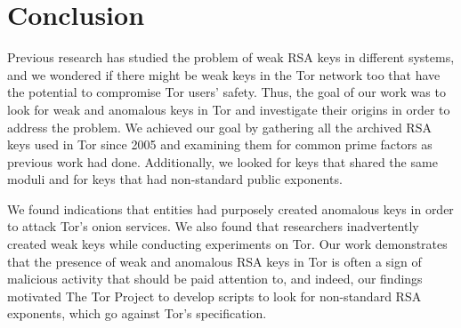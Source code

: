 \section{Conclusion}
\label{sec:conclusion}

Previous research has studied the problem of weak RSA keys in different
systems, and we wondered if there might be weak keys in the Tor
network too that have the potential to compromise Tor users' safety.
Thus, the goal of our work was to look for weak and anomalous keys in Tor
and investigate their origins in order to address the problem.  We
achieved our goal by gathering all the archived RSA keys used in Tor since
2005 and examining them for common prime factors as previous work had done.
Additionally, we looked for keys that shared the same moduli and
for keys that had non-standard public exponents.

We found indications that entities had purposely created anomalous keys 
in order to attack Tor's onion services.  We also found that researchers
inadvertently created weak keys while conducting experiments on Tor.
Our work demonstrates that the presence of weak and anomalous RSA keys in Tor is
often a sign of malicious activity that should be paid attention to, and 
indeed, our findings motivated The Tor Project to develop scripts to look for
non-standard RSA exponents, which go against Tor's specification.
